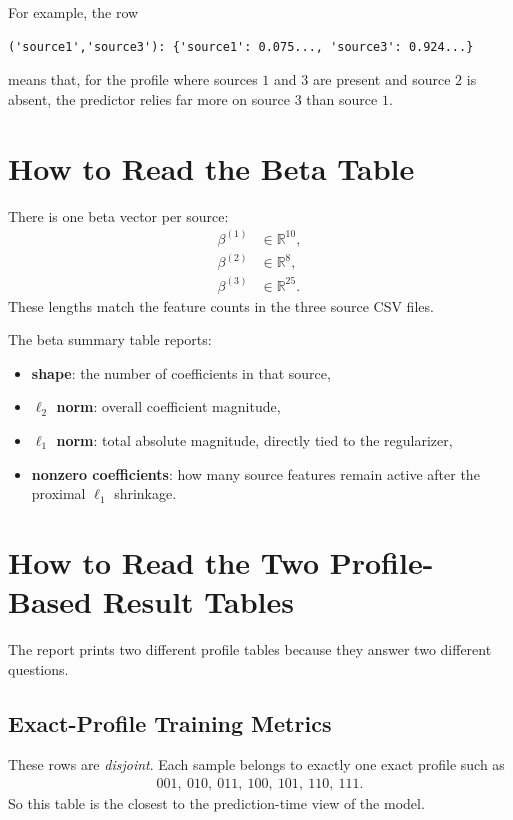 \documentclass[11pt]{article}
\begin{document}
For example, the row
\begin{verbatim}
('source1','source3'): {'source1': 0.075..., 'source3': 0.924...}
\end{verbatim}
means that, for the profile where sources $1$ and $3$ are present and source
$2$ is absent, the predictor relies far more on source $3$ than source $1$.

\section{How to Read the Beta Table}
There is one beta vector per source:
\begin{align*}
\beta^{(1)} &\in \mathbb{R}^{10}, \\
\beta^{(2)} &\in \mathbb{R}^{8}, \\
\beta^{(3)} &\in \mathbb{R}^{25}.
\end{align*}
These lengths match the feature counts in the three source CSV files.

The beta summary table reports:
\begin{itemize}
\item \textbf{shape}: the number of coefficients in that source,
\item \textbf{$\ell_2$ norm}: overall coefficient magnitude,
\item \textbf{$\ell_1$ norm}: total absolute magnitude, directly tied to the
regularizer,
\item \textbf{nonzero coefficients}: how many source features remain active
after the proximal $\ell_1$ shrinkage.
\end{itemize}

\section{How to Read the Two Profile-Based Result Tables}
The report prints two different profile tables because they answer two different
questions.

\subsection{Exact-Profile Training Metrics}
These rows are \emph{disjoint}. Each sample belongs to exactly one exact profile
such as
\begin{align*}
001,\ 010,\ 011,\ 100,\ 101,\ 110,\ 111.
\end{align*}
So this table is the closest to the prediction-time view of the model.
\end{document}

